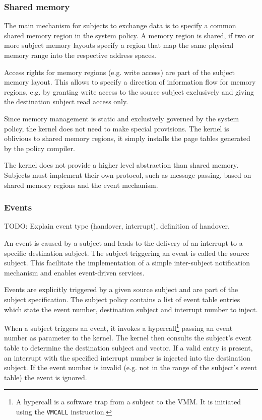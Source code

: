 \subsubsection{Shared memory}
The main mechanism for subjects to exchange data is to specify a common shared
memory region in the system policy. A memory region is shared, if two or more
subject memory layouts specify a region that map the same physical memory range
into the respective address spaces.

Access rights for memory regions (e.g. write access) are part of the subject
memory layout. This allows to specify a direction of information flow for memory
regions, e.g. by granting write access to the source subject exclusively and
giving the destination subject read access only.

Since memory management is static and exclusively governed by the system policy,
the kernel does not need to make special provisions. The kernel is oblivious to
shared memory regions, it simply installs the page tables generated by the
policy compiler.

The kernel does not provide a higher level abstraction than shared memory.
Subjects must implement their own protocol, such as message passing, based on
shared memory regions and the event mechanism.

\subsubsection{Events}\label{subsubsec:events}
TODO: Explain event type (handover, interrupt), definition of handover.

An event is caused by a subject and leads to the delivery of an interrupt to a
specific destination subject. The subject triggering an event is called the
source subject. This facilitate the implementation of a simple inter-subject
notification mechanism and enables event-driven services.

Events are explicitly triggered by a given source subject and are part of the
subject specification. The subject policy contains a list of event table
entries which state the event number, destination subject and interrupt number
to inject.

When a subject triggers an event, it invokes a hypercall\footnote{A hypercall is
a software trap from a subject to the VMM. It is initiated using the
\texttt{VMCALL} instruction.} passing an event number as parameter to the
kernel. The kernel then consults the subject's event table to determine the
destination subject and vector. If a valid entry is present, an interrupt with
the specified interrupt number is injected into the destination subject. If the
event number is invalid (e.g. not in the range of the subject's event table) the
event is ignored.

